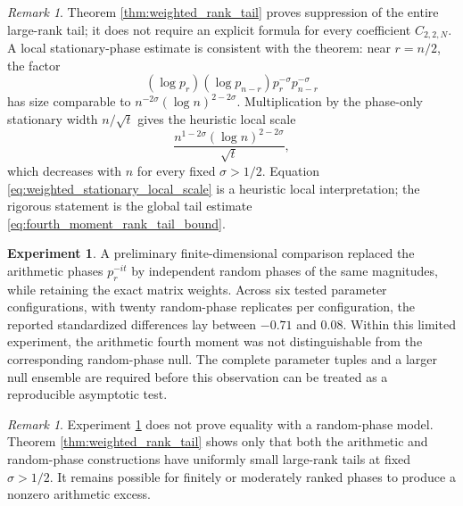 \documentclass[11pt]{amsart}
\numberwithin{equation}{section}
\theoremstyle{plain}
\theoremstyle{definition}
\newtheorem{experiment}[theorem]{Experiment}
\theoremstyle{remark}
\newtheorem{remark}[theorem]{Remark}
\begin{document}
\begin{remark}
\label{rem:weighted_stationary_mechanism}
Theorem \ref{thm:weighted_rank_tail} proves suppression of the entire large-rank tail; it does not require an explicit formula for every coefficient $C_{2,2,N}$.  A local stationary-phase estimate is consistent with the theorem: near $r=n/2$, the factor
\begin{equation}
(\log p_r)(\log p_{n-r})p_r^{-\sigma}p_{n-r}^{-\sigma}
\label{eq:local_weight_near_stationary_point}
\end{equation}
has size comparable to $n^{-2\sigma}(\log n)^{2-2\sigma}$.  Multiplication by the phase-only stationary width $n/\sqrt t$ gives the heuristic local scale
\begin{equation}
\frac{n^{1-2\sigma}(\log n)^{2-2\sigma}}{\sqrt t},
\label{eq:weighted_stationary_local_scale}
\end{equation}
which decreases with $n$ for every fixed $\sigma>1/2$.  Equation \eqref{eq:weighted_stationary_local_scale} is a heuristic local interpretation; the rigorous statement is the global tail estimate \eqref{eq:fourth_moment_rank_tail_bound}.
\end{remark}

\begin{experiment}
\label{exp:weighted_random_phase_preliminary}
A preliminary finite-dimensional comparison replaced the arithmetic phases $p_r^{-it}$ by independent random phases of the same magnitudes, while retaining the exact matrix weights.  Across six tested parameter configurations, with twenty random-phase replicates per configuration, the reported standardized differences lay between $-0.71$ and $0.08$.  Within this limited experiment, the arithmetic fourth moment was not distinguishable from the corresponding random-phase null.  The complete parameter tuples and a larger null ensemble are required before this observation can be treated as a reproducible asymptotic test.
\end{experiment}

\begin{remark}
\label{rem:random_phase_scope}
Experiment \ref{exp:weighted_random_phase_preliminary} does not prove equality with a random-phase model.  Theorem \ref{thm:weighted_rank_tail} shows only that both the arithmetic and random-phase constructions have uniformly small large-rank tails at fixed $\sigma>1/2$.  It remains possible for finitely or moderately ranked phases to produce a nonzero arithmetic excess.
\end{remark}
\end{document}
